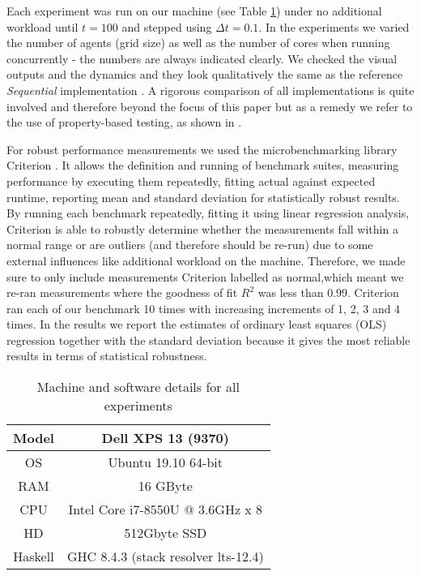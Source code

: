 Each experiment was run on our machine (see Table \ref{tab:machine_specs}) under no additional workload until $t = 100$ and stepped using $\Delta t = 0.1$. In the experiments we varied the number of agents (grid size) as well as the number of cores when running concurrently - the numbers are always indicated clearly. We checked the visual outputs and the dynamics and they look qualitatively the same as the reference \textit{Sequential} implementation \cite{thaler_pure_2018}. A rigorous comparison of all implementations is quite involved and therefore beyond the focus of this paper but as a remedy we refer to the use of property-based testing, as shown in \cite{thaler_show_2019}.

For robust performance measurements we used the microbenchmarking library Criterion \cite{criterion_serpentine, criterion_hackage}. It allows the definition and running of benchmark suites, measuring performance by executing them repeatedly, fitting actual against expected runtime, reporting mean and standard deviation for statistically robust results. By running each benchmark repeatedly, fitting it using linear regression analysis, Criterion is able to robustly determine whether the measurements fall within a normal range or are outliers (and therefore should be re-run) due to some external influences like additional workload on the machine. Therefore, we made sure to only include measurements Criterion labelled as normal,which meant we re-ran measurements where the goodness of fit $R^2$ was less than 0.99. Criterion ran each of our benchmark 10 times with increasing increments of 1, 2, 3 and 4 times. In the results we report the estimates of ordinary least squares (OLS) regression together with the standard deviation because it gives the most reliable results in terms of statistical robustness. 


\begin{table}
	\centering
	\begin{tabular}{ c || c }
		Model   & Dell XPS 13 (9370)				    \\ \hline
		OS      & Ubuntu 19.10 64-bit 				\\ \hline
		RAM     & 16 GByte 							\\ \hline
		CPU     & Intel Core i7-8550U @ 3.6GHz x 8 	\\ \hline
		HD      & 512Gbyte SSD 						\\ \hline
		Haskell & GHC 8.4.3 (stack resolver lts-12.4)
	\end{tabular}
	
	\caption{Machine and software details for all experiments}
	\label{tab:machine_specs}
\end{table}

